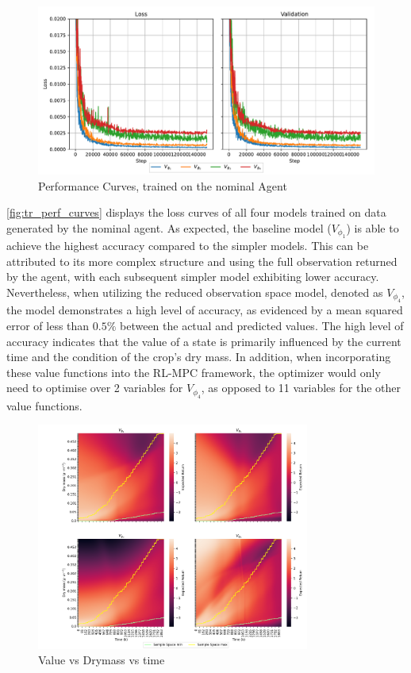 \begin{figure}[H]
    \centering
    \includegraphics[width = \textwidth]{figures/tr_training_graphs.pdf}
    \caption{Performance Curves, trained on the nominal Agent}
    \label{fig:tr_perf_curves}
\end{figure}


\autoref{fig:tr_perf_curves} displays the loss curves of all four models trained on data generated by the nominal agent. As expected, the baseline model ($V_{\phi_1}$) is able to achieve the highest accuracy compared to the simpler models. This can be attributed to its more complex structure and using the full observation returned by the agent, with each subsequent simpler model exhibiting lower accuracy. Nevertheless, when utilizing the reduced observation space model, denoted as $V_{\phi_4}$, the model demonstrates a high level of accuracy, as evidenced by a mean squared error of less than $0.5\%$ between the actual and predicted values. The high level of accuracy indicates that the value of a state is primarily influenced by the current time and the condition of the crop's dry mass. In addition, when incorporating these value functions into the RL-MPC framework, the optimizer would only need to optimise over 2 variables for $V_{\phi_4}$, as opposed to 11 variables for the other value functions. 

\begin{figure}[H]
	\centering
	\includegraphics[width = 0.8\textwidth]{figures/vf_heatmap_deterministic.png}
	\caption{Value vs Drymass vs time}
	\label{fig:vf_heatmaps}
\end{figure}


